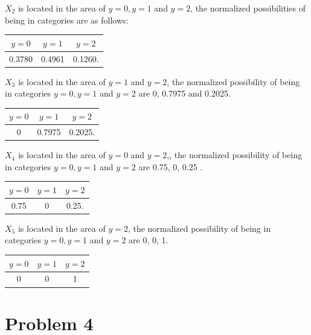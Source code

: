 \documentclass[paper=a4, fontsize=11pt]{scrartcl} %
\numberwithin{equation}{section} %
\numberwithin{figure}{section} %
\numberwithin{table}{section} %
\begin{document}
$X_2$ is located in the area of $y = 0, y = 1$ and $y = 2$, the normalized possibilities of being in categories are as follows: 
\begin{table}[!htbp]
\centering
\begin{tabular}{|c|c|c|}
\hline 
$y = 0$ & $y = 1$ & $y = 2$ \\ 
\hline 
0.3780 & 0.4961 & 0.1260. \\ 
\hline 
\end{tabular} 
\end{table}

$X_3$ is located in the area of $y = 1$ and $ y = 2$, the normalized possibility of being in categories $y = 0, y = 1$ and $y = 2$ are 0, 0.7975 and 0.2025.
\begin{table}[!htbp]
\centering
\begin{tabular}{|c|c|c|}
\hline 
$y = 0$ & $y = 1$ & $y = 2$ \\ 
\hline 
0 & 0.7975 & 0.2025. \\ 
\hline 
\end{tabular} 
\end{table}
\newline
$X_4$ is located in the area of $y = 0$ and $ y = 2$,, the normalized possibility of being in categories $y = 0, y = 1$ and $y = 2$ are 0.75, 0, 0.25 .
\begin{table}[!htbp]
\centering
\begin{tabular}{|c|c|c|}
\hline 
$y = 0$ & $y = 1$ & $y = 2$ \\ 
\hline 
0.75 & 0 & 0.25. \\ 
\hline 
\end{tabular} 
\end{table}
\newline
$X_5$ is located in the area of $y = 2$, the normalized possibility of being in categories $y = 0, y = 1$ and $y = 2$ are 0, 0, 1.
\begin{table}[!htbp]
\centering
\begin{tabular}{|c|c|c|}
\hline 
$y = 0$ & $y = 1$ & $y = 2$ \\ 
\hline 
0 & 0 & 1 \\ 
\hline 
\end{tabular} 
\end{table}
\section{Problem 4}
\end{document}
